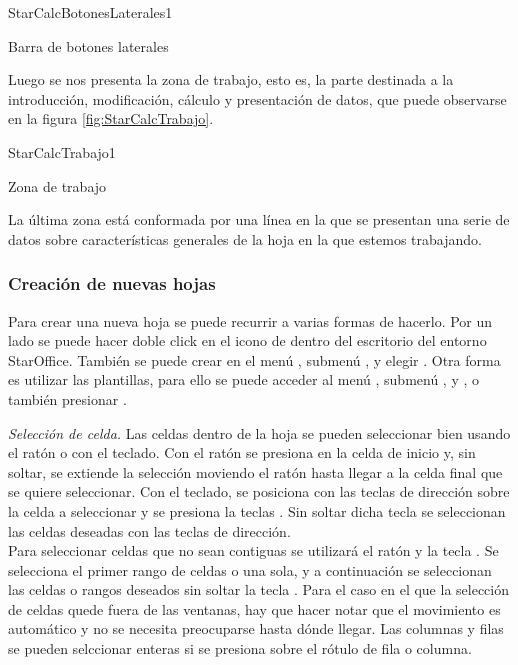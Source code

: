 \begin{figura}{StarCalcBotonesLaterales}{1}
\caption{Barra de botones laterales}
\label{fig:StarCalcBotoensLaterales}
\end{figura}


Luego se nos presenta la zona de trabajo, esto es, la parte destinada a la
introducción,  modificación, cálculo y presentación de datos, que puede
observarse en la figura \ref{fig:StarCalcTrabajo}.
 
\begin{figura}{StarCalcTrabajo}{1}
\caption{Zona de trabajo}
\label{fig:StarCalcTrabajo}
\end{figura}


La última zona está conformada por una línea en la que se presentan una serie
de datos  sobre características generales de la hoja en la que estemos
trabajando.   




\subsubsection{Creación de nuevas hojas}
Para crear una nueva hoja se puede recurrir a varias formas de hacerlo.
Por un lado se puede hacer doble click en el icono de
 dentro del escritorio del entorno StarOffice.
También se puede crear en el menú , submenú ,
y elegir . Otra forma es utilizar las plantillas,
para ello se puede acceder al menú  , submenú ,
y , o también presionar .

\emph{Selección de celda.}
Las celdas dentro de la hoja se pueden seleccionar bien usando el ratón 
o con el teclado. Con el ratón se presiona en la celda de inicio y, sin 
soltar, se extiende la selección moviendo el ratón hasta llegar a la celda 
final que se quiere seleccionar. Con el teclado, se posiciona con las teclas 
de dirección sobre la celda a seleccionar y se presiona la teclas . 
Sin soltar dicha tecla se seleccionan las celdas deseadas con las teclas de 
dirección.\\ 
Para seleccionar celdas que no sean contiguas se utilizará el ratón y la 
tecla . Se selecciona el primer rango de celdas o una sola, y a 
continuación se seleccionan las celdas o rangos deseados sin soltar la  
tecla .
Para el caso en el que la selección de celdas quede fuera de las ventanas, 
hay que hacer notar que el movimiento es automático y no se necesita 
preocuparse hasta dónde llegar. 
Las columnas y filas se pueden selccionar enteras si se presiona sobre 
el rótulo de fila o columna. 

